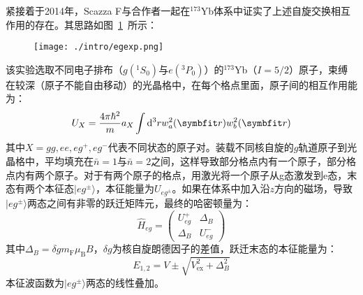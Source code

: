 紧接着于2014年，Scazza F\cite{scazza2014observation}与合作者一起在${}^{173}$Yb体系中证实了上述自旋交换相互作用的存在。其思路如图~\ref{egexp}~所示：
\begin{figure}[!htbp]
    \centering
    \texttt{[image: ./intro/egexp.png]}
    \label{egexp}
\end{figure}
该实验选取不同电子排布（$g({}^1S_0)$与$e({}^3P_0)$）的${}^{173}$Yb（$I=5/2$）原子，束缚在较深（原子不能自由移动）的光晶格中，在每个格点里面，原子间的相互作用能为：
\begin{equation}
U_{X}=\frac{4 \pi \hbar^{2}}{m} a_{X} \int \mathrm{d}^{3} r w_{a}^{2}(\Vector{r}) w_{b}^{2}(\Vector{r})
\end{equation}
其中$X =gg, ee, eg^+, eg^−$代表不同状态的原子对。装载不同核自旋的$g$轨道原子到光晶格中，平均填充在$\bar{n}=1$与$\bar{n}=2$之间，这样导致部分格点内有一个原子，部分格点内有两个原子。对于有两个原子的格点，用激光将一个原子从g态激发到e态，末态有两个本征态$|eg^\pm\rangle$，本征能量为$U_{eg^\pm}$。如果在体系中加入沿$z$方向的磁场，导致$|eg^\pm\rangle$两态之间有非零的跃迁矩阵元，最终的哈密顿量为：
\begin{equation}
\hat{H}_{eg}=\left(\begin{array}{cc}
U_{e g}^{+} & \Delta_{B} \\
\Delta_{B} & U_{e g}^{-}
\end{array}\right)
\end{equation}
其中$\Delta_{B}=\delta g m_{\mathrm{F}} \mu_{\mathrm{B}} B$，$\delta g$为核自旋朗德因子的差值，跃迁末态的本征能量为：
\begin{equation}
E_{1,2}=V \pm \sqrt{V_{\mathrm{ex}}^{2}+\Delta_{B}^{2}}
\end{equation}
本征波函数为$|eg^\pm\rangle$两态的线性叠加。

\begin{comment}
如图~\ref{egd}~
\begin{figure}[!htbp]
    \centering
    \texttt{[image: chap1spexd.png]}
    \bicaption{图a代表实验测到的吸收谱，不同的峰代表了不同的末态。图b代表观测到自旋交换体系的的自旋动力学。摘自\citep{cappellini2014direct}}{Fig(A) for spectrum of clock transition. Fig(B) for time resolved spin transition. dynamics. Reprinted from \citep{cappellini2014direct}}
    \label{egd}
\end{figure}
\end{comment}

